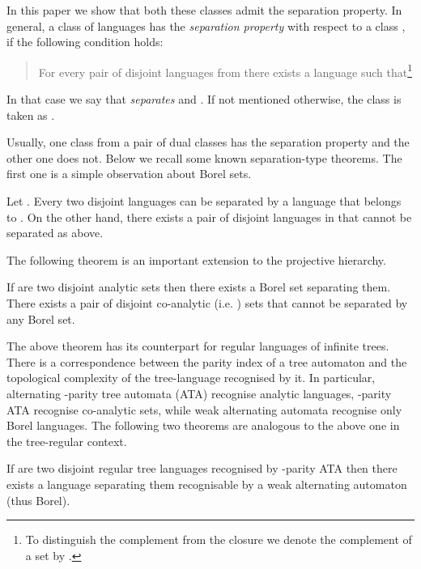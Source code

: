 \documentclass{LMCS}
\begin{document}
In this paper we show that both these classes admit the separation property. In general, a class of languages  has the \emph{separation property} with respect to a class , if the following condition holds:

\begin{quote}
For every pair of disjoint languages  from  there exists a language  such that\footnote{To distinguish the complement from the closure we denote the complement of a set  by .}

\end{quote}

In that case we say that  \emph{separates}  and . If not mentioned otherwise, the class  is taken as .

Usually, one class from a pair of dual classes  has the separation property and the other one does not. Below we recall some known separation-type theorems. The first one is a simple observation about Borel sets.

\begin{theorem}
Let . Every two disjoint  languages can be separated by a language that belongs to . On the other hand, there exists a pair of disjoint languages in  that cannot be separated as above.
\end{theorem}

The following theorem is an important extension to the projective hierarchy.

\begin{theorem}
If  are two disjoint analytic sets then there exists a Borel set separating them. There exists a pair of disjoint co-analytic (i.e. ) sets that cannot be separated by any Borel set.
\end{theorem}

The above theorem has its counterpart for regular languages of infinite trees. There is a correspondence between the parity index of a tree automaton and the topological complexity of the tree-language recognised by it. In particular, alternating -parity tree automata (ATA) recognise analytic languages, -parity ATA recognise co-analytic sets, while weak alternating automata recognise only Borel languages. The following two theorems are analogous to the above one in the tree-regular context.

\begin{theorem}\label{th:rabin_sep}
If  are two disjoint regular tree languages recognised by -parity ATA then there exists a language separating them recognisable by a weak alternating automaton (thus Borel).
\end{theorem}
\end{document}
